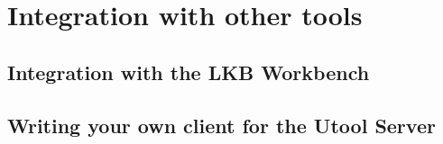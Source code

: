 \section{Integration with other tools}  \label{sec:integration}




\subsection{Integration with the LKB Workbench}
\label{sec:integration-lkb}


\subsection{Writing your own client for the Utool Server}




